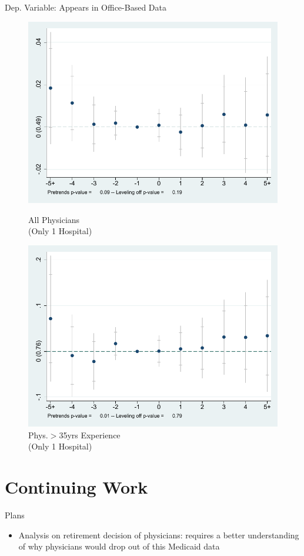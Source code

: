 \documentclass[10pt]{beamer}
\begin{document}
\begin{frame}{Dep. Variable: Appears in Office-Based Data}
\begin{figure}[ht]
        \begin{minipage}[b]{0.47\linewidth}
            \centering
            \includegraphics[width=\textwidth]{Objects/xtevent_hosp_fullsample_office.pdf}
            \caption{\small All Physicians \\(Only 1 Hospital)}
        \end{minipage}
        \hspace{0.2cm}
        \begin{minipage}[b]{0.47\linewidth}
            \centering
            \includegraphics[width=\textwidth]{Objects/xtevent_hosp_oldsample_office.pdf}
            \caption{\small Phys.$>$35yrs Experience\\ (Only 1 Hospital)}
        \end{minipage}
    \end{figure}
\end{frame}


\section{Continuing Work}

\begin{frame}{Plans}
    \begin{itemize}
        \item Analysis on retirement decision of physicians: requires a better understanding of why physicians would drop out of this Medicaid data
    \end{itemize}
\end{frame}
\end{document}
